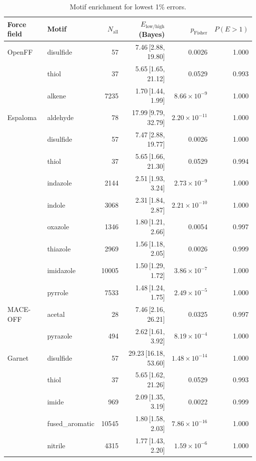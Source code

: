 \begin{table}[t]
  \centering
  \small
  \setlength{\tabcolsep}{6pt}
  \renewcommand{\arraystretch}{1.15}
  \begin{tabular}{llrrrr}
    \hline
    Force field & Motif & $N_\mathrm{all}$ & $E_{\mathrm{low/high}}$ (Bayes) & $p_\mathrm{Fisher}$ & $P(E>1)$ \\
    \hline
    OpenFF & disulfide & 57 & 7.46\,[2.88, 19.80] & 0.0026 & 1.000 \\
      & thiol & 37 & 5.65\,[1.65, 21.12] & 0.0529 & 0.993 \\
      & alkene & 7235 & 1.70\,[1.44, 1.99] & $8.66\times 10^{-9}$ & 1.000 \\
    \hline
    Espaloma & aldehyde & 78 & 17.99\,[9.79, 32.79] & $2.20\times 10^{-11}$ & 1.000 \\
      & disulfide & 57 & 7.47\,[2.88, 19.77] & 0.0026 & 1.000 \\
      & thiol & 37 & 5.65\,[1.66, 21.30] & 0.0529 & 0.994 \\
      & indazole & 2144 & 2.51\,[1.93, 3.24] & $2.73\times 10^{-9}$ & 1.000 \\
      & indole & 3068 & 2.31\,[1.84, 2.87] & $2.21\times 10^{-10}$ & 1.000 \\
      & oxazole & 1346 & 1.80\,[1.21, 2.66] & 0.0054 & 0.997 \\
      & thiazole & 2969 & 1.56\,[1.18, 2.05] & 0.0026 & 0.999 \\
      & imidazole & 10005 & 1.50\,[1.29, 1.72] & $3.86\times 10^{-7}$ & 1.000 \\
      & pyrrole & 7533 & 1.48\,[1.24, 1.75] & $2.49\times 10^{-5}$ & 1.000 \\
    \hline
    MACE-OFF & acetal & 28 & 7.46\,[2.16, 26.21] & 0.0325 & 0.997 \\
      & pyrazole & 494 & 2.62\,[1.61, 3.92] & $8.19\times 10^{-4}$ & 1.000 \\
    \hline
    Garnet & disulfide & 57 & 29.23\,[16.18, 53.60] & $1.48\times 10^{-14}$ & 1.000 \\
      & thiol & 37 & 5.65\,[1.62, 21.26] & 0.0529 & 0.993 \\
      & imide & 969 & 2.09\,[1.35, 3.19] & 0.0022 & 0.999 \\
      & fused\_aromatic & 10545 & 1.80\,[1.58, 2.03] & $7.86\times 10^{-16}$ & 1.000 \\
      & nitrile & 4315 & 1.77\,[1.43, 2.20] & $1.59\times 10^{-6}$ & 1.000 \\
    \hline
  \end{tabular}
  \caption{Motif enrichment for lowest 1\% errors.}
  \label{tab:split_angles_best}
\end{table}